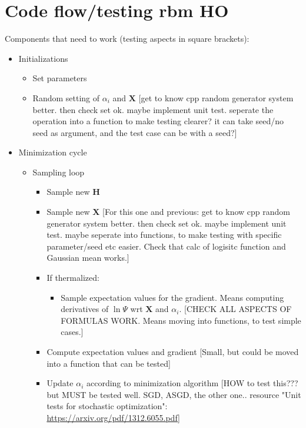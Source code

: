 \documentclass[norsk,a4paper,11pt]{article}
\begin{document}
\section{Code flow/testing rbm HO}
Components that need to work (testing aspects in square brackets):
\begin{itemize}
	\item Initializations
	\begin{itemize}
		\item Set parameters
		\item Random setting of $\alpha_i$ and $\mathbf{X}$ [get to know cpp random generator system better. then check set ok. maybe implement unit test. seperate the operation into a function to make testing clearer? it can take seed/no seed as argument, and the test case can be with a seed?]
	\end{itemize}
	\item Minimization cycle
	\begin{itemize}
		\item Sampling loop
		\begin{itemize}
			\item Sample new $\mathbf{H}$
			\item Sample new $\mathbf{X}$ [For this one and previous: get to know cpp random generator system better. then check set ok. maybe implement unit test. maybe seperate into functions, to make testing with specific parameter/seed etc easier. Check that calc of logisitc function and Gaussian mean works.]
			\item If thermalized:
			\begin{itemize}
				\item Sample expectation values for the gradient. Means computing derivatives of $\ln{\Psi}$ wrt $\mathbf{X}$ and $\alpha_i$. [CHECK ALL ASPECTS OF FORMULAS WORK. Means moving into functions, to test simple cases.]
			\end{itemize}
			\item Compute expectation values and gradient [Small, but could be moved into a function that can be tested]
			\item Update $\alpha_i$ according to minimization algorithm [HOW to test this??? but MUST be tested well. SGD, ASGD, the other one.. resource "Unit tests for stochastic optimization": \url{https://arxiv.org/pdf/1312.6055.pdf}]
		\end{itemize}
	\end{itemize}
\end{itemize}
\end{document}

